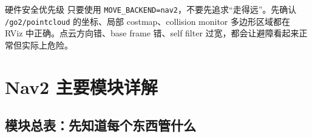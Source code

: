 \documentclass[UTF8,11pt,a4paper,openany]{ctexrep}
\newcommand{\code}[1]{\nolinkurl{#1}}
\newcommand{\topic}[1]{\nolinkurl{#1}}
\begin{document}
\begin{warnbox}{硬件安全优先级}
只要使用 \code{MOVE_BACKEND=nav2}，不要先追求“走得远”。先确认 \topic{/go2/pointcloud} 的坐标、局部 costmap、collision monitor 多边形区域都在 RViz 中正确。点云方向错、base frame 错、self filter 过宽，都会让避障看起来正常但实际上危险。
\end{warnbox}

\chapter{Nav2 主要模块详解}
\label{chap:modules}

\section{模块总表：先知道每个东西管什么}
\end{document}

